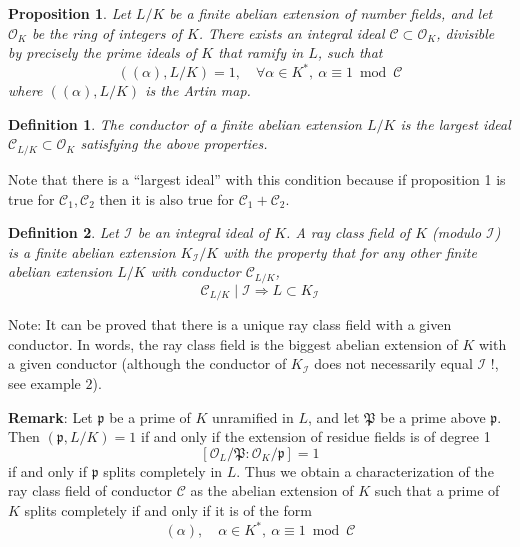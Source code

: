 \documentclass[12pt]{article}
\newtheorem{defn}{Definition}
\newtheorem{prop}{Proposition}
\begin{document}
\begin{prop}
Let $L/K$ be a finite abelian extension of number fields, and let
$\mathcal{O}_K$ be the ring of integers of $K$. There exists an
integral ideal $\mathcal{C}\subset \mathcal{O}_K$, divisible by
precisely the prime ideals of $K$ that ramify in $L$, such that
$$\left((\alpha),L/K\right)=1,\quad \forall \alpha \in K^{\ast},\
\alpha\equiv1\ \operatorname{mod}\ \mathcal{C}
$$ where
$\left((\alpha),L/K\right)$ is the Artin map.
\end{prop}

\begin{defn}
The \emph{conductor} of a finite abelian extension $L/K$ is the
largest ideal $\mathcal{C}_{L/K}\subset \mathcal{O}_K$ satisfying
the above properties.
\end{defn}

Note that there is a ``largest ideal'' with this condition because
if proposition 1 is true for $\mathcal{C}_1,\mathcal{C}_2$ then it
is also true for $\mathcal{C}_1+\mathcal{C}_2$.

\begin{defn}
Let $\mathcal{I}$ be an integral ideal of $K$. A \emph{ray class
field} of $K$ (modulo $\mathcal{I}$) is a finite abelian extension
$K_{\mathcal{I}}/K$ with the property that for any other finite
abelian extension $L/K$ with conductor $\mathcal{C}_{L/K}$,
$$\mathcal{C}_{L/K} \mid \mathcal{I}\Rightarrow
L\subset K_{\mathcal{I}}$$
\end{defn}

Note: It can be proved that there is a unique ray class field with
a given conductor. In words, the ray class field is the biggest
abelian extension of $K$ with a given conductor (although the
conductor of $K_{\mathcal{I}}$ does not necessarily equal
$\mathcal{I}$ !, see example $2$).

{\bf Remark}: Let $\mathfrak{p}$ be a prime of $K$ unramified in $L$, and let $\mathfrak{P}$ be a prime above $\mathfrak{p}$. Then $(\mathfrak{p},L/K)=1$ if and only if the extension of residue fields is of degree 1
$$[\mathcal{O}_L/\mathfrak{P}\colon \mathcal{O}_K/\mathfrak{p}]=1$$
if and only if $\mathfrak{p}$ splits completely in $L$. Thus we obtain a characterization of the ray class field of conductor $\mathcal{C}$ as the abelian extension of $K$ such that a prime of $K$ splits completely if and only if it is of the form
$$(\alpha),\quad \alpha \in K^{\ast},\
\alpha\equiv1\ \operatorname{mod}\ \mathcal{C}$$
\end{document}
